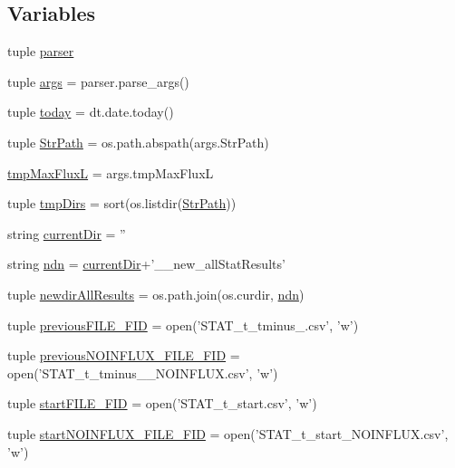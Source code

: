 \subsection*{Variables}
\begin{DoxyCompactItemize}
\item 
tuple \hyperlink{a00099_ac24ead92a86e25ec9213d8c7253d4b60}{parser}
\item 
tuple \hyperlink{a00099_a4912a255d0be60fffea119e6bd92b6e4}{args} = parser.\-parse\-\_\-args()
\item 
tuple \hyperlink{a00099_ac99ee9d8196d8a2305b9f4c795b23b97}{today} = dt.\-date.\-today()
\item 
tuple \hyperlink{a00099_ac34f3f43f888eb6620266d78ce928ceb}{Str\-Path} = os.\-path.\-abspath(args.\-Str\-Path)
\item 
\hyperlink{a00099_a22a52c6b87e96dc826bc621ee88c380a}{tmp\-Max\-Flux\-L} = args.\-tmp\-Max\-Flux\-L
\item 
tuple \hyperlink{a00099_ab71c19ee20acae0f07934a8d0e9fe50b}{tmp\-Dirs} = sort(os.\-listdir(\hyperlink{a00099_ac34f3f43f888eb6620266d78ce928ceb}{Str\-Path}))
\item 
string \hyperlink{a00099_ae98225d5c8c20399f5c3b888fa37746f}{current\-Dir} = ''
\item 
string \hyperlink{a00099_a5e117df6e0cdffdae13947622c6c4890}{ndn} = \hyperlink{a00099_ae98225d5c8c20399f5c3b888fa37746f}{current\-Dir}+'\-\_\-\_\-new\-\_\-all\-Stat\-Results'
\item 
tuple \hyperlink{a00099_a62d6cfd52b4428ab7ea4d75d43b2d49b}{newdir\-All\-Results} = os.\-path.\-join(os.\-curdir, \hyperlink{a00099_a5e117df6e0cdffdae13947622c6c4890}{ndn})
\item 
tuple \hyperlink{a00099_aba65725a1bd6d1b891b02dc7f3db2335}{previous\-F\-I\-L\-E\-\_\-\-F\-I\-D} = open('S\-T\-A\-T\-\_\-t\-\_\-tminus\-\_.\-csv', 'w')
\item 
tuple \hyperlink{a00099_a9f9485bf6f7a3734bbd110b756005b71}{previous\-N\-O\-I\-N\-F\-L\-U\-X\-\_\-\-F\-I\-L\-E\-\_\-\-F\-I\-D} = open('S\-T\-A\-T\-\_\-t\-\_\-tminus\-\_\-\_\-\-N\-O\-I\-N\-F\-L\-U\-X.\-csv', 'w')
\item 
tuple \hyperlink{a00099_a0239a9dcc4900463a0c19557bec23521}{start\-F\-I\-L\-E\-\_\-\-F\-I\-D} = open('S\-T\-A\-T\-\_\-t\-\_\-start.\-csv', 'w')
\item 
tuple \hyperlink{a00099_a44f4f158af9771fbabbbacc4f4484d32}{start\-N\-O\-I\-N\-F\-L\-U\-X\-\_\-\-F\-I\-L\-E\-\_\-\-F\-I\-D} = open('S\-T\-A\-T\-\_\-t\-\_\-start\-\_\-\-N\-O\-I\-N\-F\-L\-U\-X.\-csv', 'w')

\end{DoxyCompactItemize}
